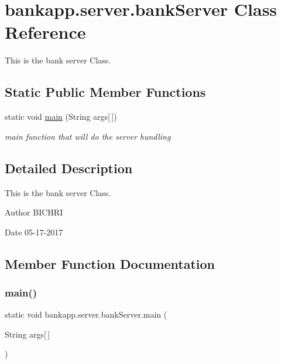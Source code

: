 \hypertarget{classbankapp_1_1server_1_1bankServer}{}\section{bankapp.\+server.\+bank\+Server Class Reference}
\label{classbankapp_1_1server_1_1bankServer}


This is the bank server Class.  


\subsection*{Static Public Member Functions}
\begin{DoxyCompactItemize}
\item 
static void \hyperlink{classbankapp_1_1server_1_1bankServer_aca6d24bb05576a3668a4421453785f90}{main} (String args\mbox{[}$\,$\mbox{]})
\begin{DoxyCompactList}\small\item\em main function that will do the server hundling \end{DoxyCompactList}\end{DoxyCompactItemize}


\subsection{Detailed Description}
This is the bank server Class. 

\begin{DoxyAuthor}{Author}
B\+I\+C\+H\+RI 
\end{DoxyAuthor}
\begin{DoxyDate}{Date}
05-\/17-\/2017 
\end{DoxyDate}


\subsection{Member Function Documentation}
\mbox{\label{classbankapp_1_1server_1_1bankServer_aca6d24bb05576a3668a4421453785f90}} 
\subsubsection{\texorpdfstring{main()}{main()}}
{\footnotesize\ttfamily static void bankapp.\+server.\+bank\+Server.\+main (\begin{DoxyParamCaption}\item[{String}]{args\mbox{[}$\,$\mbox{]} }\end{DoxyParamCaption})\hspace{0.3cm}{\ttfamily [static]}}



